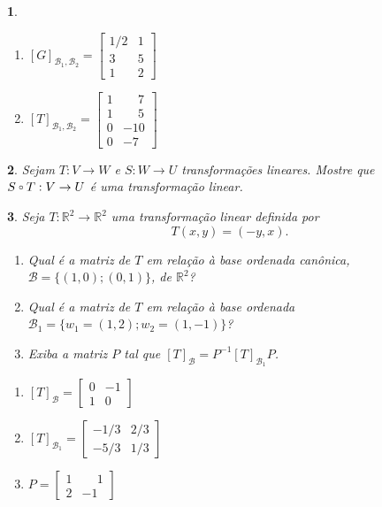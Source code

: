 \documentclass[12pt]{exam}
\newtheorem{exercicio}{}
\newcommand{\real}{\mathbb{R}}
\newcommand{\compcent}[1]{\vcenter{\hbox{$#1\circ$}}}
\newcommand{\comp}{\mathbin{\mathchoice
{\compcent\scriptstyle}{\compcent\scriptstyle}
{\compcent\scriptscriptstyle}{\compcent\scriptscriptstyle}}}
\begin{document}
\begin{exercicio}
\begin{solucao}
\begin{enumerate}[label=({\alph*})]
        \item $[G]_{\mathcal{B}_1, \mathcal{B}_2} = \begin{bmatrix}
          1/2 & 1\\
          3 & 5\\
          1 & 2
        \end{bmatrix}$

        \item $[T]_{\mathcal{B}_1, \mathcal{B}_2} = \begin{bmatrix}
          1 & \phantom{-}7\\
          1 & \phantom{-}5\\
          0 & -10\\
          0 & -7
        \end{bmatrix}$
      \end{enumerate}
    \end{solucao}
\end{exercicio}

\begin{exercicio}
  Sejam $T : V \to W$ e $S : W \to U$ transforma\c{c}\~oes lineares. Mostre que $S \comp T : V \to U$ \'e uma transforma\c{c}\~ao linear.
\end{exercicio}

\begin{exercicio}
  Seja $T : \real^2 \to \real^2$ uma transforma\c{c}\~ao linear definida por
  \[
    T(x,y) = (-y,x).
  \]
  \begin{enumerate}[label=({\alph*})]
    \item Qual \'e a matriz de $T$ em rela\c{c}\~ao \`a base ordenada can\^onica, $\mathcal{B} = \{(1,0); (0,1)\}$, de $\real^2$?
    \item Qual \'e a matriz de $T$ em rela\c{c}\~ao \`a base ordenada $\mathcal{B}_1 = \{w_1 = (1,2); w_2 = (1,-1)\}$?
    \item Exiba a matriz $P$ tal que $[T]_{\mathcal{B}} = P^{-1}[T]_{\mathcal{B}_1}P$.
  \end{enumerate}
  \begin{solucao}
    \begin{enumerate}[label=({\alph*})]
      \item $[T]_\mathcal{B} = \begin{bmatrix}
        0 & -1\\
        1 & 0
      \end{bmatrix}$
      \item $[T]_{\mathcal{B}_1} = \begin{bmatrix}
        -1/3 & 2/3\\
        -5/3 & 1/3
      \end{bmatrix}$
      \item $P = \begin{bmatrix}
        1 & \phantom{-}1\\
        2 & -1
      \end{bmatrix}$
    \end{enumerate}
  \end{solucao}
\end{exercicio}
\end{document}
